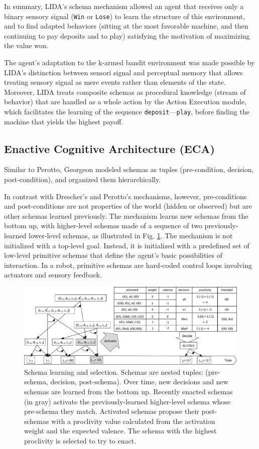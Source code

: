 \documentclass[runningheads]{llncs}
\begin{document}
In summary, LIDA's schema mechanism allowed an agent that receives only a binary sensory signal (\texttt{Win} or \texttt{Lose}) to learn the structure of this environment, and to find adapted behaviors (sitting at the most favorable machine, and then continuing to pay deposits and to play) satisfying the motivation of maximizing the value won. 

The agent's adaptation to the k-armed bandit environment was made possible by LIDA's distinction between sensori signal and perceptual memory that allows treating sensory signal as mere events rather than elements of the state. 
Moreover, LIDA treats composite schemas as procedural knowledge (stream of behavior) that are handled as a whole action by the Action Execution module, which facilitates the learning of the sequence \texttt{deposit}---\texttt{play}, before finding the machine that yields the highest payoff. 

\subsection{Enactive Cognitive Architecture (ECA)}

Similar to Perotto, Georgeon modeled schemas as tuples (pre-condition, decision, post-condition), and organized them  hierarchically. 

In contrast with Drescher's and Perotto's mechanisms, however, pre-conditions and post-conditions are not properties of the world (hidden or observed) but are other schemas learned previously. 
The mechanism learns new schemas from the bottom up, with higher-level schemas made of a sequence of two previously-learned lower-level schemas, 
as illustrated in Fig. \ref{fig:agent8}. 
The mechanism is not initialized with a top-level goal. 
Instead, it is initialized with a predefined set of low-level primitive schemas that define the agent's basic possibilities of interaction. 
In a robot, primitive schemas are hard-coded control loops involving actuators and sensory feedback. 


\begin{figure}
	\centering
	\includegraphics[width=1.0\textwidth]{Figure_3_agent8.pdf}
	\caption{Schema learning and selection.
		Schemas are nested tuples: (pre-schema, decision, post-schema).
		Over time, new decisions and new schemas are learned from the bottom up. 
		Recently enacted schemas (in gray) activate the previously-learned higher-level schema whose pre-schema they match.
		Activated schemas propose their post-schemas with a proclivity value calculated from the activation weight and the expected valence.
		The schema with the highest proclivity is selected to try to enact.} 
	\label{fig:agent8}
\end{figure}
\end{document}
